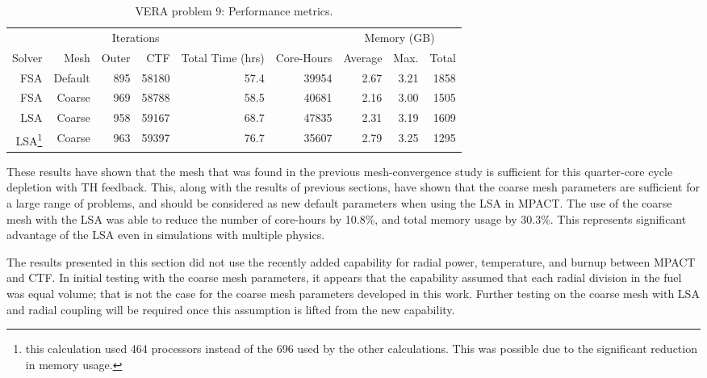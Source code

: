 {{{      \begin{table}[htbp]
        \centering
        \caption{VERA problem 9: Performance metrics.\label{tab:LSMOC:P9:Performance}}
        \begin{tabular}{rrrrrrrrr}\toprule
                 &      & \multicolumn{2}{c}{Iterations} & & & \multicolumn{3}{c}{Memory (GB)}\\\cline{3-4}\cline{7-9}
          Solver & Mesh    & Outer &   CTF & Total Time (hrs) & Core-Hours & Average & Max. & Total\\\midrule
             FSA & Default &   895 & 58180 &            57.4  &      39954 &    2.67 & 3.21 & 1858\\
             FSA &  Coarse\footnotemark[1] &   969 & 58788 &            58.5  &      40681 &    2.16 & 3.00 & 1505\\
             LSA &  Coarse\footnotemark[1] &   958 & 59167 &            68.7  &      47835 &    2.31 & 3.19 & 1609\\
             LSA\footnote{this calculation used 464 processors instead of the 696 used by the other calculations. This was possible due to the significant reduction in memory usage.}
                 & Coarse  & 963 & 59397 & 76.7 & 35607 & 2.79 & 3.25 & 1295\\\bottomrule
        \end{tabular}
      \end{table}

      These results have shown that the mesh that was found in the previous mesh-convergence study is sufficient for this quarter-core cycle depletion with \ac{TH} feedback.
      This, along with the results of previous sections, have shown that the coarse mesh parameters are sufficient for a large range of problems, and should be considered as new default parameters when using the \ac{LSA} in MPACT.
      The use of the coarse mesh with the \ac{LSA} was able to reduce the number of core-hours by 10.8\%, and total memory usage by 30.3\%.
      This represents significant advantage of the \ac{LSA} even in simulations with multiple physics.

      The results presented in this section did not use the recently added capability for radial power, temperature, and burnup between MPACT and CTF.
      In initial testing with the coarse mesh parameters, it appears that the capability assumed that each radial division in the fuel was equal volume; that is not the case for the coarse mesh parameters developed in this work.
      Further testing on the coarse mesh with \ac{LSA} and radial coupling will be required once this assumption is lifted from the new capability.
    }
  }
}
